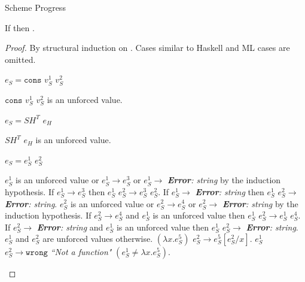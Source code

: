 \begin{theorem}{Scheme Progress}

\label{thmpss}

If \judes{}{\first{\varexps}}{\tytst} then \pshyp{\first{\varexps}}{\second{\varexps}}.

\begin{proof}

By structural induction on \first{\varexps}.  Cases similar to Haskell and ML cases are omitted.


\begin{case}

$e_{S}=\mathtt{cons}$ $v_{S}^{1}$ $v_{S}^{2}$

$\mathtt{cons}$ $v_{S}^{1}$ $v_{S}^{2}$ is an unforced value.

\end{case}


\begin{case}

$e_{S}=SH^{T}$ $e_{H}$

$SH^{T}$ $e_{H}$ is an unforced value.

\end{case}


\begin{case}

$e_{S}=e_{S}^{1}$ $e_{S}^{2}$

$e_{S}^{1}$ is an unforced value or $e_{S}^{1}\rightarrow e_{S}^{3}$ or $e_{S}^{1}\rightarrow$ \emph{\textbf{Error}: string} by the induction hypothesis.  If $e_{S}^{1}\rightarrow e_{S}^{3}$ then $e_{S}^{1}$ $e_{S}^{2}\rightarrow e_{S}^{3}$ $e_{S}^{2}$.  If $e_{S}^{1}\rightarrow$ \emph{\textbf{Error}: string} then $e_{S}^{1}$ $e_{S}^{2}\rightarrow$ \emph{\textbf{Error}: string}.  $e_{S}^{2}$ is an unforced value or $e_{S}^{2}\rightarrow e_{S}^{4}$ or $e_{S}^{2}\rightarrow$ \emph{\textbf{Error}: string} by the induction hypothesis.  If $e_{S}^{2}\rightarrow e_{S}^{4}$ and $e_{S}^{1}$ is an unforced value then $e_{S}^{1}$ $e_{S}^{2}\rightarrow e_{S}^{1}$ $e_{S}^{4}$.  If $e_{S}^{2}\rightarrow$ \emph{\textbf{Error}: string} and $e_{S}^{1}$ is an unforced value then $e_{S}^{1}$ $e_{S}^{2}\rightarrow$ \emph{\textbf{Error}: string}.  $e_{S}^{1}$ and $e_{S}^{2}$ are unforced values otherwise.  $(\lambda x.e_{S}^{5})$ $e_{S}^{2}\rightarrow e_{S}^{5}[e_{S}^{2}/x]$.  $e_{S}^{1}$ $e_{S}^{2}\rightarrow\mathtt{wrong}$ \emph{``Not a function"} $(e_{S}^{1}\neq\lambda x.e_{S}^{5})$.


\end{case}
\end{proof}
\end{theorem}
